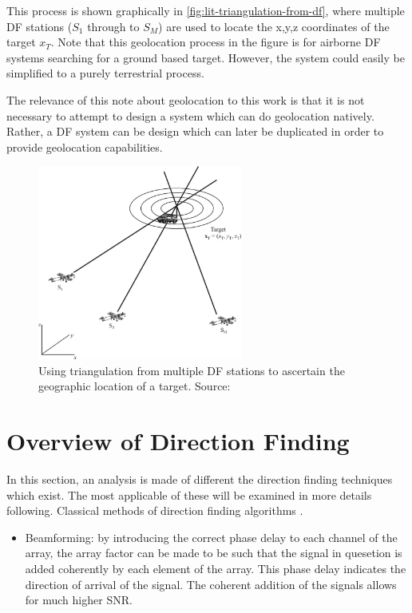 This process is shown graphically in \autoref{fig:lit-triangulation-from-df}, where multiple DF stations ($S_{1}$ through to $S_{M}$) are used to locate the x,y,z coordinates of the target $x_{T}$. Note that this geolocation process in the figure is for airborne DF systems searching for a ground based target. However, the system could easily be simplified to a purely terrestrial process.

The relevance of this note about geolocation to this work is that it is not necessary to attempt to design a system which can do geolocation natively. Rather, a DF system can be design which can later be duplicated in order to provide geolocation capabilities. 

\begin{figure}[p] 
  \centering
  \includegraphics[width=0.6\textwidth]{./img/lit_review/triangulation_from_df.pdf}
  \caption{Using triangulation from multiple DF stations to ascertain the geographic location of a target. Source: \cite{poisel2012electronic}}
  \label{fig:lit-triangulation-from-df}
\end{figure}

\section{Overview of Direction Finding}
In this section, an analysis is made of different the direction finding techniques which exist. The most applicable of these will be examined in more details following.
Classical methods of direction finding algorithms \cite{tuncer2009classical}.
\begin{itemize}
	\item Beamforming: by introducing the correct phase delay to each channel of the array, the array factor can be made to be such that the signal in quesetion is added coherently by each element of the array.
		This phase delay indicates the direction of arrival of the signal. The coherent addition of the signals allows for much higher SNR. 
\end{itemize}



